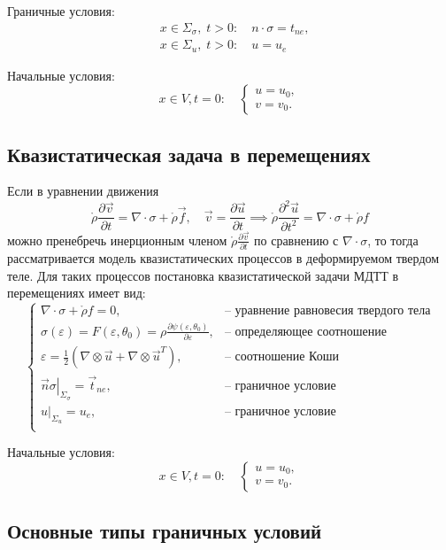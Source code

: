 Граничные условия:
\begin{align*}
	&x\in\Sigma_\sigma,\; t>0:\quad n\cdot\sigma=t_{ne},\\
	&x\in\Sigma_u,\; t>0:\quad u=u_e
\end{align*}

Начальные условия:
\[
	x\in V,t=0:\quad \begin{cases}
		u=u_0,\\
		v=v_0.
	\end{cases}
\]

\subsection{Квазистатическая задача в перемещениях}

Если в уравнении движения
\[
	\mathring{\rho}\frac{\partial\vec{v}}{\partial t}=\nabla\cdot\sigma+\mathring{\rho}\vec{f},\quad\vec{v}=\frac{\partial\vec{u}}{\partial t}\implies
	\mathring{\rho}\frac{\partial^2\vec{u}}{\partial t^2}=\nabla\cdot\sigma+\mathring{\rho}f
\]
можно пренебречь инерционным членом $\mathring{\rho}\frac{\partial\vec{v}}{\partial t}$ по сравнению с $\nabla\cdot\sigma$, то тогда рассматривается модель квазистатических процессов в деформируемом твердом теле. Для таких процессов постановка квазистатической задачи МДТТ в перемещениях имеет вид:
\[
\begin{cases}
	\nabla\cdot\sigma+\mathring{\rho}f = 0, &\text{-- уравнение равновесия твердого тела}\\
	\sigma(\varepsilon) = F(\varepsilon,\theta_0)=\rho\frac{\partial\psi(\varepsilon,\theta_0)}{\partial\varepsilon},&\text{-- определяющее соотношение}\\
	\varepsilon=\frac{1}{2}(\nabla\otimes\vec{u}+\nabla\otimes\vec{u}^T),&\text{-- соотношение Коши}\\
	\left. \vec{n}\sigma\right|_{\Sigma_\sigma} = \vec{t}_{ne}, &\text{-- граничное условие}\\
	\left. u\right|_{\Sigma_u} = u_e, &\text{-- граничное условие}\\
\end{cases}
\]

Начальные условия:
\[
x\in V,t=0:\quad \begin{cases}
	u=u_0,\\
	v=v_0.
\end{cases}
\]

\subsection{Основные типы граничных условий}

